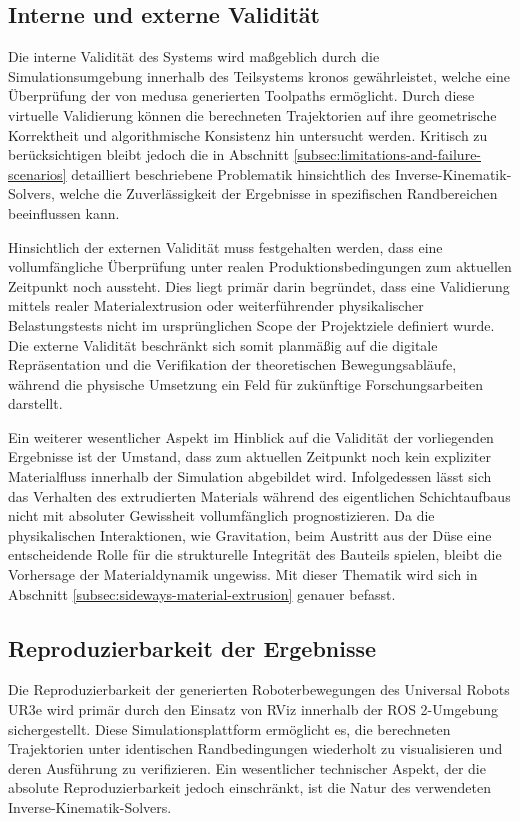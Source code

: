     \subsection{Interne und externe Validität} \label{subsec:internal-and-external-validity}
    Die interne Validität des Systems wird maßgeblich durch die Simulationsumgebung innerhalb des Teilsystems \ac{kronos} gewährleistet, welche eine Überprüfung der von \ac{medusa} generierten Toolpaths ermöglicht.
    Durch diese virtuelle Validierung können die berechneten Trajektorien auf ihre geometrische Korrektheit und algorithmische Konsistenz hin untersucht werden.
    Kritisch zu berücksichtigen bleibt jedoch die in Abschnitt \ref{subsec:limitations-and-failure-scenarios} detailliert beschriebene Problematik hinsichtlich des Inverse-Kinematik-Solvers, welche die Zuverlässigkeit der Ergebnisse in spezifischen Randbereichen beeinflussen kann.

    Hinsichtlich der externen Validität muss festgehalten werden, dass eine vollumfängliche Überprüfung unter realen Produktionsbedingungen zum aktuellen Zeitpunkt noch aussteht.
    Dies liegt primär darin begründet, dass eine Validierung mittels realer Materialextrusion oder weiterführender physikalischer Belastungstests nicht im ursprünglichen Scope der Projektziele definiert wurde.
    Die externe Validität beschränkt sich somit planmäßig auf die digitale Repräsentation und die Verifikation der theoretischen Bewegungsabläufe, während die physische Umsetzung ein Feld für zukünftige Forschungsarbeiten darstellt.
    
    Ein weiterer wesentlicher Aspekt im Hinblick auf die Validität der vorliegenden Ergebnisse ist der Umstand, dass zum aktuellen Zeitpunkt noch kein expliziter Materialfluss innerhalb der Simulation abgebildet wird.
    Infolgedessen lässt sich das Verhalten des extrudierten Materials während des eigentlichen Schichtaufbaus nicht mit absoluter Gewissheit vollumfänglich prognostizieren.
    Da die physikalischen Interaktionen, wie Gravitation, beim Austritt aus der Düse eine entscheidende Rolle für die strukturelle Integrität des Bauteils spielen, bleibt die Vorhersage der Materialdynamik ungewiss.
    Mit dieser Thematik wird sich in Abschnitt \ref{subsec:sideways-material-extrusion} genauer befasst.
    
    \subsection{Reproduzierbarkeit der Ergebnisse}\label{subsec:reproducibility-of-results}
      Die Reproduzierbarkeit der generierten Roboterbewegungen des Universal Robots UR3e wird primär durch den Einsatz von RViz innerhalb der \ac{ROS} 2-Umgebung sichergestellt.
      Diese Simulationsplattform ermöglicht es, die berechneten Trajektorien unter identischen Randbedingungen wiederholt zu visualisieren und deren Ausführung zu verifizieren.
      Ein wesentlicher technischer Aspekt, der die absolute Reproduzierbarkeit jedoch einschränkt, ist die Natur des verwendeten Inverse-Kinematik-Solvers.

